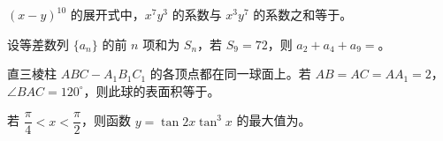 \begin{question}
$(x-y)^{10}$ 的展开式中，$x^7y^3$ 的系数与 $x^3y^7$ 的系数之和等于\gkblank{}。

\end{question}
\begin{question}
设等差数列 $\{a_n\}$ 的前 $n$ 项和为 $S_n$，若 $S_9=72$，则 $a_2+a_4+a_9=$\gkblank{}。

\end{question}
\begin{question}
直三棱柱 $ABC-A_1B_1C_1$ 的各顶点都在同一球面上。若 $AB=AC=AA_1=2$，$\angle BAC=120^\circ$，则此球的表面积等于\gkblank{}。

\end{question}
\begin{question}
若 $\dfrac\pi4<x<\dfrac\pi2$，则函数 $y=\tan2x\tan^3x$ 的最大值为\gkblank{}。

\end{question}


